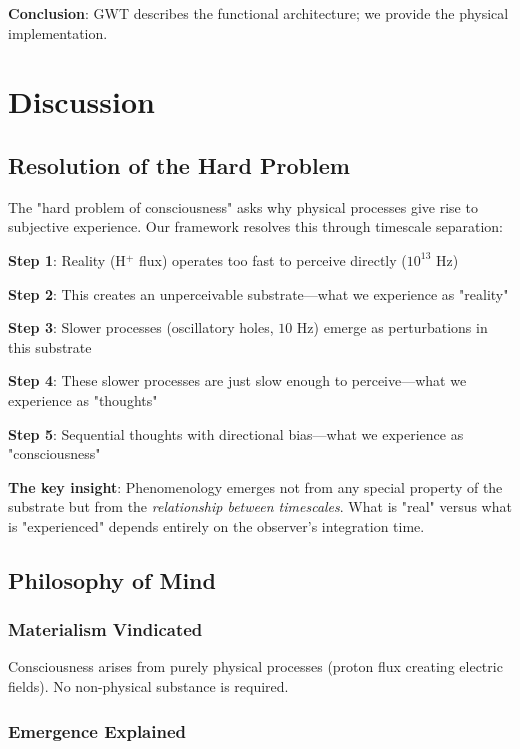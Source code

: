 \documentclass[12pt,a4paper]{article}
\begin{document}
\textbf{Conclusion}: GWT describes the functional architecture; we provide the physical implementation.

\section{Discussion}

\subsection{Resolution of the Hard Problem}

The "hard problem of consciousness" asks why physical processes give rise to subjective experience. Our framework resolves this through timescale separation:

\textbf{Step 1}: Reality (H$^+$ flux) operates too fast to perceive directly ($10^{13}$ Hz)

\textbf{Step 2}: This creates an unperceivable substrate—what we experience as "reality"

\textbf{Step 3}: Slower processes (oscillatory holes, $10$ Hz) emerge as perturbations in this substrate

\textbf{Step 4}: These slower processes are just slow enough to perceive—what we experience as "thoughts"

\textbf{Step 5}: Sequential thoughts with directional bias—what we experience as "consciousness"

\textbf{The key insight}: Phenomenology emerges not from any special property of the substrate but from the \textit{relationship between timescales}. What is "real" versus what is "experienced" depends entirely on the observer's integration time.

\subsection{Philosophy of Mind}

\subsubsection{Materialism Vindicated}

Consciousness arises from purely physical processes (proton flux creating electric fields). No non-physical substance is required.

\subsubsection{Emergence Explained}
\end{document}
